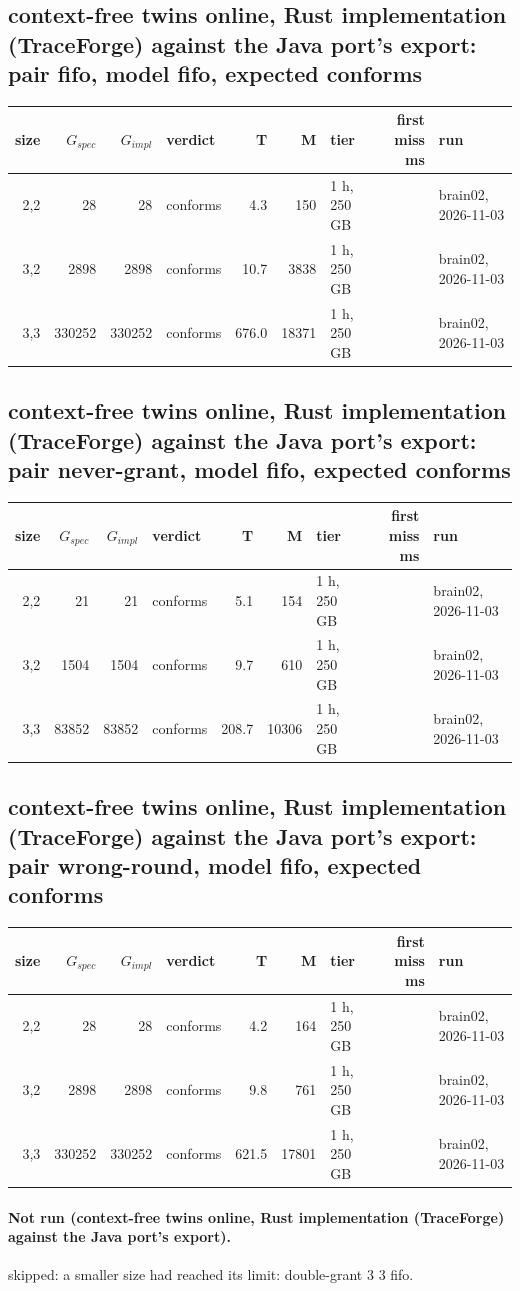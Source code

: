 \documentclass[10pt]{article}
\begin{document}
\subsection*{context-free twins online, Rust implementation (TraceForge) against the Java port's export: pair \textsf{fifo}, model fifo, expected conforms}
\begin{longtable}{@{}rrrlrrlrl@{}}
\toprule
size & $G_{\mathit{spec}}$ & $G_{\mathit{impl}}$ & verdict & T & M & tier & first miss ms & run \\
\midrule
\endhead
\color{red} 2,2 & 28 & 28 & conforms & 4.3 & 150 & 1 h, 250 GB &  & brain02, 2026-11-03 \\
\color{red} 3,2 & 2898 & 2898 & conforms & 10.7 & 3838 & 1 h, 250 GB &  & brain02, 2026-11-03 \\
\color{red} 3,3 & 330252 & 330252 & conforms & 676.0 & 18371 & 1 h, 250 GB &  & brain02, 2026-11-03 \\
\bottomrule
\end{longtable}
\subsection*{context-free twins online, Rust implementation (TraceForge) against the Java port's export: pair \textsf{never-grant}, model fifo, expected conforms}
\begin{longtable}{@{}rrrlrrlrl@{}}
\toprule
size & $G_{\mathit{spec}}$ & $G_{\mathit{impl}}$ & verdict & T & M & tier & first miss ms & run \\
\midrule
\endhead
\color{red} 2,2 & 21 & 21 & conforms & 5.1 & 154 & 1 h, 250 GB &  & brain02, 2026-11-03 \\
\color{red} 3,2 & 1504 & 1504 & conforms & 9.7 & 610 & 1 h, 250 GB &  & brain02, 2026-11-03 \\
\color{red} 3,3 & 83852 & 83852 & conforms & 208.7 & 10306 & 1 h, 250 GB &  & brain02, 2026-11-03 \\
\bottomrule
\end{longtable}
\subsection*{context-free twins online, Rust implementation (TraceForge) against the Java port's export: pair \textsf{wrong-round}, model fifo, expected conforms}
\begin{longtable}{@{}rrrlrrlrl@{}}
\toprule
size & $G_{\mathit{spec}}$ & $G_{\mathit{impl}}$ & verdict & T & M & tier & first miss ms & run \\
\midrule
\endhead
\color{red} 2,2 & 28 & 28 & conforms & 4.2 & 164 & 1 h, 250 GB &  & brain02, 2026-11-03 \\
\color{red} 3,2 & 2898 & 2898 & conforms & 9.8 & 761 & 1 h, 250 GB &  & brain02, 2026-11-03 \\
\color{red} 3,3 & 330252 & 330252 & conforms & 621.5 & 17801 & 1 h, 250 GB &  & brain02, 2026-11-03 \\
\bottomrule
\end{longtable}
\paragraph{Not run (context-free twins online, Rust implementation (TraceForge) against the Java port's export).}
skipped: a smaller size had reached its limit: double-grant 3 3 fifo.\par
\end{document}
